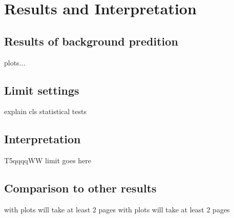 \chapter{Results and Interpretation}
\section{Results of background predition}
\newpage
plots...
\newpage
\section{Limit settings}
explain cls
\newpage
statistical tests
\newpage

\section{Interpretation}
T5qqqqWW limit goes here

\newpage
\section{Comparison to other results}
\newpage
with plots will take at least 2 pages 
\newpage
with plots will take at least 2 pages 
